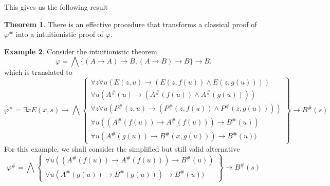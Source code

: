 \documentclass[a4paper,11pt]{report}
\theoremstyle{definition}
\newtheorem{theorem}{Theorem}[section]
\theoremstyle{definition}
\theoremstyle{definition}
\theoremstyle{definition}
\theoremstyle{definition}
\theoremstyle{definition}
\newtheorem{example}[theorem]{Example}
\theoremstyle{definition}
\begin{document}
	This gives us the following result
	\begin{theorem}
		There is an effective procedure that transforms a classical proof of $\varphi^\#$ into a intuitionistic proof of $\varphi$.
	\end{theorem}
	\begin{example}
		Consider the intuitionistic theorem $$\varphi = \bigwedge\{(A\to A)\to B, (A\to B)\to B\}\to B.$$
		which is translated to
		\[
			\varphi^\# = \exists xE(x, s)\to \bigwedge\left\lbrace
			\begin{matrix}
				\forall z\forall u(E(z, u)\to (E(z, f(u))\wedge E(z, g(u))))\\
				\forall u(A^\#(u)\to  (A^\#(f(u))\wedge A^\#(g(u))))\\
				\forall z\forall u(P^\#(z, u)\to (P^\#(z, f(u))\wedge P^\#(z, g(u))))\\
				\forall u((A^\#(f(u))\to A^\#(f(u)))\to B^\#(u))\\
				\forall u(A^\#(g(u))\to B^\#(x, g(u)))\to B^\#(u))
			\end{matrix}\right\rbrace 
			\to B^\#(s)
		\]
			For this example, we shall consider the simplified but still valid alternative
			\[
			\varphi^\# = \bigwedge\left\lbrace
			\begin{matrix}
				\forall u((A^\#(f(u))\to A^\#(f(u)))\to B^\#(u))\\
				\forall u(A^\#(g(u))\to B^\#(g(u)))\to B^\#(u))
			\end{matrix}\right\rbrace 
			\to B^\#(s)
			\]
			

\end{example}
\end{document}
